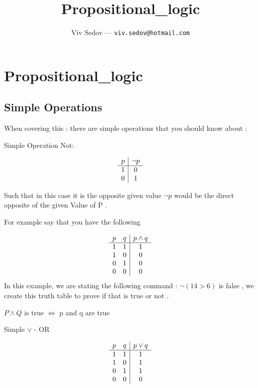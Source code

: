 \documentclass{article}
\theoremstyle{mytheoremstyle}
\theoremstyle{mytheoremstyle}
\theoremstyle{myproblemstyle}
\begin{document}
\title{
	Propositional_logic
}
\author{
	Viv Sedov --- \texttt{viv.sedov@hotmail.com}
}
\maketitle

\tableofcontents

\newpage



\section{Propositional\_logic}

\subsection{Simple Operations}
When covering this : there are simple operations that you should know about :

Simple Operation Not:

\[\begin{array}{c | c}
		p & \neg p \\
		\hline
		1 & 0      \\
		0 & 1
	\end{array}
\]

Such that in this case it is the opposite given value $\neg p $ would be the direct opposite of the given Value of P .

For example say that you have the following

\[\begin{array}{c c | c}
		p & q & p \land q \\
		\hline
		1 & 1 & 1         \\
		1 & 0 & 0         \\
		0 & 1 & 0         \\
		0 & 0 & 0
	\end{array}\]
In this example, we are stating the following command : $\neg(14 > 6)$ is false , we create this truth table to prove if that is true or not .

$P \land Q $ is true $\iff$ p and q are true

Simple $\lor$ - OR


\[\begin{array}{c c | c}
		p & q & p \lor q \\
		\hline
		1 & 1 & 1        \\
		1 & 0 & 1        \\
		0 & 1 & 1        \\
		0 & 0 & 0        \\
	\end{array}\]
\end{document}
